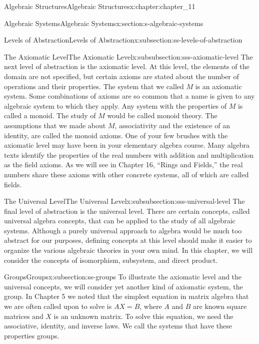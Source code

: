 \documentclass[twoside,10pt,]{book}
\numberwithin{equation}{section}
\begin{document}
\begin{chapterptx}{Algebraic Structures}{}{Algebraic Structures}{}{}{x:chapter:chapter_11}
\begin{sectionptx}{Algebraic Systems}{}{Algebraic Systems}{}{}{x:section:s-algebraic-systems}
\begin{subsectionptx}{Levels of Abstraction}{}{Levels of Abstraction}{}{}{x:subsection:ss-levels-of-abstraction}
\begin{subsubsectionptx}{The Axiomatic Level}{}{The Axiomatic Level}{}{}{x:subsubsection:sss-axiomatic-level}
The next level of abstraction is the axiomatic level. At this level, the elements of the domain are not specified, but certain axioms are stated about the number of operations and their properties. The system that we called \(M\) is an axiomatic system. Some combinations of axioms are so common that a name is given to any algebraic system  to which they apply. Any system with the properties of \(M\) is called a monoid. The study of \(M\) would be called monoid theory. The assumptions that we made about \(M\), associativity and the existence of an identity, are called the monoid axioms. One of your few brushes with the axiomatic level may have been in your elementary algebra course. Many algebra texts identify the properties of the real numbers with addition and multiplication as the field axioms. As we will see in Chapter 16, ``Rings and Fields,'' the real numbers share these axioms with other concrete systems, all of which are called fields.%
\end{subsubsectionptx}
%
%
\typeout{************************************************}
\typeout{************************************************}
%
\begin{subsubsectionptx}{The Universal Level}{}{The Universal Level}{}{}{x:subsubsection:sss-universal-level}
The final level of abstraction is the universal level. There are certain concepts, called universal algebra concepts, that can be applied to the study of all algebraic systems. Although a purely universal approach to algebra would be much too abstract for our purposes, defining concepts at this level should make it easier to organize the various algebraic theories in your own mind. In this chapter, we will consider the concepts of isomorphism, subsystem, and direct product.%
\end{subsubsectionptx}
\end{subsectionptx}
%
%
\typeout{************************************************}
\typeout{************************************************}
%
\begin{subsectionptx}{Groups}{}{Groups}{}{}{x:subsection:ss-groups}
To illustrate the axiomatic level and the universal concepts, we will consider yet another kind of axiomatic system, the group. In Chapter 5 we noted that the simplest equation in matrix algebra that we are often called upon to solve is \(A X = B\), where \(A\) and \(B\) are known square matrices and \(X\) is an unknown matrix. To solve this equation, we need the associative, identity, and inverse laws. We call the systems that have these properties groups.%

\end{subsectionptx}
\end{sectionptx}
\end{chapterptx}
\end{document}

